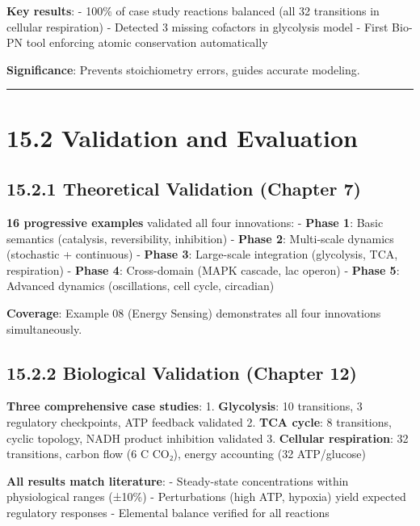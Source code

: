 \textbf{Key results}: - 100\% of case study reactions balanced (all 32
transitions in cellular respiration) - Detected 3 missing cofactors in
glycolysis model - First Bio-PN tool enforcing atomic conservation
automatically

\textbf{Significance}: Prevents stoichiometry errors, guides accurate
modeling.

\begin{center}\rule{0.5\linewidth}{0.5pt}\end{center}

\hypertarget{validation-and-evaluation}{%
\section{15.2 Validation and
Evaluation}\label{validation-and-evaluation}}

\hypertarget{theoretical-validation-chapter-7}{%
\subsection{15.2.1 Theoretical Validation (Chapter
7)}\label{theoretical-validation-chapter-7}}

\textbf{16 progressive examples} validated all four innovations: -
\textbf{Phase 1}: Basic semantics (catalysis, reversibility, inhibition)
- \textbf{Phase 2}: Multi-scale dynamics (stochastic + continuous) -
\textbf{Phase 3}: Large-scale integration (glycolysis, TCA, respiration)
- \textbf{Phase 4}: Cross-domain (MAPK cascade, lac operon) -
\textbf{Phase 5}: Advanced dynamics (oscillations, cell cycle,
circadian)

\textbf{Coverage}: Example 08 (Energy Sensing) demonstrates all four
innovations simultaneously.

\hypertarget{biological-validation-chapter-12}{%
\subsection{15.2.2 Biological Validation (Chapter
12)}\label{biological-validation-chapter-12}}

\textbf{Three comprehensive case studies}: 1. \textbf{Glycolysis}: 10
transitions, 3 regulatory checkpoints, ATP feedback validated 2.
\textbf{TCA cycle}: 8 transitions, cyclic topology, NADH product
inhibition validated 3. \textbf{Cellular respiration}: 32 transitions,
carbon flow (6 C  CO₂), energy accounting (32 ATP/glucose)

\textbf{All results match literature}: - Steady-state concentrations
within physiological ranges (±10\%) - Perturbations (high ATP, hypoxia)
yield expected regulatory responses - Elemental balance verified for all
reactions

